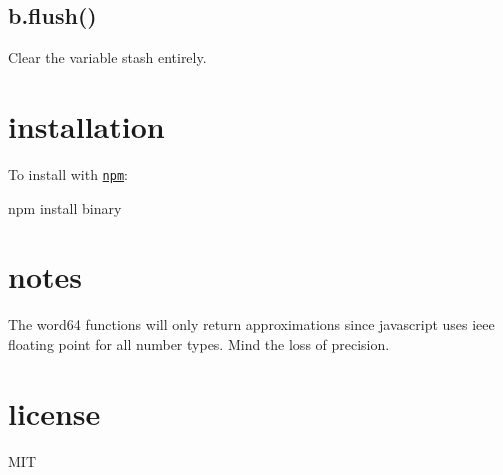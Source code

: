 \subsection*{b.\+flush() }

Clear the variable stash entirely.

\section*{installation }

To install with \href{http://github.com/isaacs/npm}{\tt npm}\+:


\begin{DoxyCode}
npm install binary
\end{DoxyCode}


\section*{notes }

The word64 functions will only return approximations since javascript uses ieee floating point for all number types. Mind the loss of precision.

\section*{license }

M\+IT 